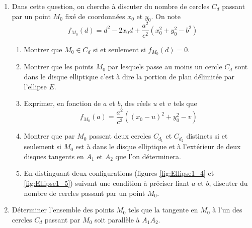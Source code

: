 \begin{enumerate}
\item Dans cette question, on cherche à discuter du nombre de cercles $C_d$ passant par un point $M_0$ fixé de coordonnées $x_0$ et $y_0$. On note
\begin{displaymath}
 f_{M_0}(d) = d^2-2x_0d+\frac{a^2}{c^2}(x_0^2+y_0^2-b^2)
\end{displaymath}
\begin{enumerate}
\item Montrer que $M_0 \in C_d$ si et seulement si $f_{M_0}(d) = 0$.
\item Montrer que les points $M_0$ par lesquels passe au moins un cercle $C_d$ sont dans le disque elliptique c'est à dire la portion de plan délimitée par l'ellipse $E$.
\item Exprimer, en fonction de $a$ et $b$, des réels $u$ et $v$ tels que
\begin{displaymath}
 f_{M_0}(a) = \frac{a^2}{c^2}\left( (x_0-u)^2+y_0^2-v\right) 
\end{displaymath}

\item Montrer que par $M_0$  passent  deux cercles $C_{d_1}$ et $C_{d_2}$ distincts si et seulement si $M_0$ est à dans le disque elliptique et à l'extérieur de deux disques tangents en $A_1$ et $A_2$ que l'on déterminera.
\item En distinguant deux configurations (figures \ref{fig:Ellipse1_4} et \ref{fig:Ellipse1_5}) suivant une condition à préciser liant $a$ et $b$, discuter du nombre de cercles passant par un point $M_0$.
\end{enumerate}

\item Déterminer l'ensemble des points $M_0$ tels que la tangente en $M_0$ à l'un des cercles $C_d$ passant par $M_0$ soit parallèle à $A_1A_2$.
\end{enumerate}
